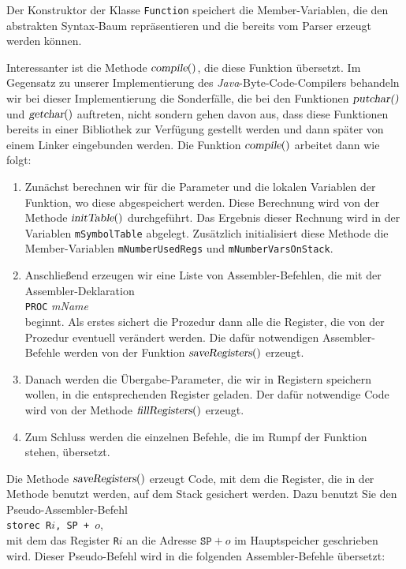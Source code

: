Der Konstruktor der Klasse \texttt{Function} speichert die Member-Variablen, die den
abstrakten Syntax-Baum repr\"asentieren und die bereits vom Parser erzeugt werden k\"onnen.

Interessanter ist die Methode $\textsl{compile}()$, die diese Funktion \"ubersetzt.
Im Gegensatz zu unserer Implementierung des \textsl{Java}-Byte-Code-Compilers behandeln
wir bei dieser Implementierung die Sonderf\"alle, die bei den Funktionen 
$\textsl{putchar()}$ und $\textsl{getchar}()$ auftreten, nicht sondern gehen davon aus,
dass diese Funktionen bereits in einer Bibliothek zur Verf\"ugung gestellt werden und dann
sp\"ater von einem Linker eingebunden werden.  Die Funktion $\textsl{compile}()$ arbeitet
dann wie folgt:
\begin{enumerate}
\item Zun\"achst berechnen wir f\"ur die Parameter und die lokalen Variablen der Funktion,
      wo diese abgespeichert werden.  Diese Berechnung wird von der Methode
      $\textsl{initTable}()$ durchgef\"uhrt.  Das Ergebnis dieser Rechnung wird
      in der Variablen \texttt{mSymbolTable} abgelegt.  Zus\"atzlich initialisiert diese
      Methode die Member-Variablen \texttt{mNumberUsedRegs} und \texttt{mNumberVarsOnStack}. 
\item Anschlie{\ss}end erzeugen wir eine Liste von Assembler-Befehlen, die mit der Assembler-Deklaration
      \\[0.2cm]
      \hspace*{1.3cm}
      \texttt{PROC} \textsl{mName}
      \\[0.2cm]
      beginnt.  Als erstes sichert die Prozedur dann alle die Register, die von der Prozedur
      eventuell ver\"andert werden.  Die daf\"ur notwendigen Assembler-Befehle werden von der
      Funktion $\textsl{saveRegisters}()$ erzeugt.
\item Danach werden die \"Ubergabe-Parameter, die wir in Registern speichern wollen,
      in die entsprechenden Register geladen.  Der daf\"ur notwendige Code wird von der
      Methode $\textsl{fillRegisters}()$ erzeugt.
\item Zum Schluss werden die einzelnen Befehle, die im Rumpf der Funktion stehen, \"ubersetzt.      
\end{enumerate}
Die Methode $\textsl{saveRegisters}()$ erzeugt Code, mit dem die Register, die in der
Methode benutzt werden, auf dem Stack gesichert werden.  Dazu benutzt Sie den
Pseudo-Assembler-Befehl
\\[0.2cm]
\hspace*{1.3cm}
\texttt{storec R$i$, SP + $o$},
\\[0.2cm]
mit dem das Register \texttt{R$i$} an die Adresse  $\texttt{SP} + o$ im Hauptspeicher
geschrieben wird.  Dieser Pseudo-Befehl wird in die folgenden Assembler-Befehle \"ubersetzt:

